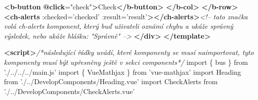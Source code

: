 \documentclass[
]{article}
\newenvironment{Shaded}{}{}
\newcommand{\CommentTok}[1]{\textcolor[rgb]{0.38,0.63,0.69}{\textit{#1}}}
\newcommand{\ErrorTok}[1]{\textcolor[rgb]{1.00,0.00,0.00}{\textbf{#1}}}
\newcommand{\ImportTok}[1]{#1}
\newcommand{\KeywordTok}[1]{\textcolor[rgb]{0.00,0.44,0.13}{\textbf{#1}}}
\newcommand{\NormalTok}[1]{#1}
\newcommand{\OperatorTok}[1]{\textcolor[rgb]{0.40,0.40,0.40}{#1}}
\newcommand{\OtherTok}[1]{\textcolor[rgb]{0.00,0.44,0.13}{#1}}
\newcommand{\StringTok}[1]{\textcolor[rgb]{0.25,0.44,0.63}{#1}}
\begin{document}
\begin{Shaded}
\begin{Highlighting}[]
                \KeywordTok{<b-button} \ErrorTok{@click}\OtherTok{=}\StringTok{"check"}\KeywordTok{>}\NormalTok{Check}\KeywordTok{</b-button>}
            \KeywordTok{</b-col>}
        \KeywordTok{</b-row>}    
        \KeywordTok{<ch-alerts}\OtherTok{ :checked=}\StringTok{'checked'}\OtherTok{ :result=}\StringTok{'result'}\KeywordTok{></ch-alerts>}\CommentTok{<!-- tato značka volá }
\CommentTok{        ch-alerts komponent, }
\CommentTok{        který buď uživateli oznámí chybu a ukáže správný výsledek, nebo ukáže hlášku: }
\CommentTok{        "Správně" -->}
    \KeywordTok{</div>}
\KeywordTok{</template>}

\KeywordTok{<script>}\CommentTok{/*následující řádky uvádí, které komponenty se musí naimportovat, tyto komponenty }
\CommentTok{        musí být upřesněny ještě v sekci components*/}
    \ImportTok{import} \OperatorTok{\{}\NormalTok{ bus }\OperatorTok{\}} \ImportTok{from} \StringTok{'./../../../main.js'}
    \ImportTok{import} \OperatorTok{\{}\NormalTok{ VueMathjax }\OperatorTok{\}} \ImportTok{from} \StringTok{'vue-mathjax'}
    \ImportTok{import}\NormalTok{ Heading }\ImportTok{from} \StringTok{'./../DevelopComponents/Heading.vue'}
    \ImportTok{import}\NormalTok{ CheckAlerts }\ImportTok{from} \StringTok{'./../DevelopComponents/CheckAlerts.vue'}


\end{Highlighting}
\end{Shaded}
\end{document}
